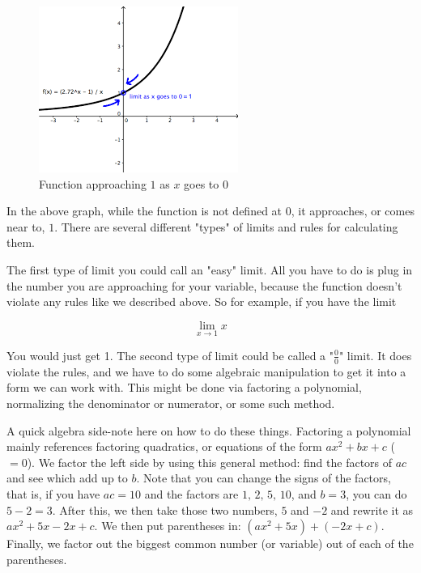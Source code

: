 \documentclass{memoir}
\begin{document}
\begin{figure}[H]
\caption{Function approaching $1$ as $x$ goes to $0$}
\includegraphics[scale=0.8]{../images.png}
\end{figure}

In the above graph, while the function is not defined at $0$, it approaches, or comes near to, $1$. 
There are several different "types" of limits and rules for calculating them. 

The first type of limit you could call an "easy" limit. 
All you have to do is plug in the number you are approaching for your variable, because the function doesn't violate any rules like we described above. 
So for example, if you have the limit

\begin{equation*}
    \lim\limits_{x\rightarrow 1} x
\end{equation*}

You would just get 1. 
The second type of limit could be called a "$\frac{0}{0}$" limit. 
It does violate the rules, and we have to do some algebraic manipulation to get it into a form we can work with. 
This might be done via factoring a polynomial, normalizing the denominator or numerator, or some such method.

A quick algebra side-note here on how to do these things. 
Factoring a polynomial mainly references factoring quadratics, or equations of the form $ax^2 + bx + c$ ($=0$). 
We factor the left side by using this general method: find the factors of $ac$ and see which add up to $b$. 
Note that you can change the signs of the factors, that is, if you have $ac = 10$ and the factors are $1, \, 2, \, 5, \, 10$, and $b = 3$, you can do $5-2 = 3$. 
After this, we then take those two numbers, $5$ and $-2$ and rewrite it as $ax^2 + 5x -2x + c$. 
We then put parentheses in: $(ax^2 + 5x) + (-2x + c)$. 
Finally, we factor out the biggest common number (or variable) out of each of the parentheses.
\end{document}
